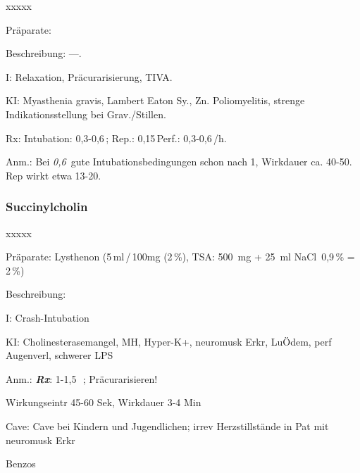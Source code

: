 \begin{labeling}[~]{xxxxx}
  \item[Präparate:] 
  \item[Beschreibung:] ---.
  \item[I:]Relaxation, Präcurarisierung, TIVA.
  \item[KI:]Myasthenia gravis, Lambert Eaton Sy., Zn.
  Poliomyelitis, strenge Indikationsstellung bei Grav./Stillen.
  \item[Rx:] Intubation: 0,3-0,6\,; Rep.:
  0,15\,\newline Perf.: 0,3-0,6\,/h.
  \item[Anm.:] Bei \textit{0,6\,} gute Intubationsbedingungen schon nach
  1{\textquotesingle}, Wirkdauer ca. 40-50{\textquotesingle}. Rep wirkt
  etwa 13-20{\textquotesingle}.
\end{labeling}



\subsubsection{Succinylcholin}
\begin{labeling}[~]{xxxxx}
  \item[Präparate:] Lysthenon (5\,ml\,/\,100mg (2\,\%), TSA: 500~mg + 25~ml NaCl~0,9\,\% = 2\,\%)
  \item[Beschreibung:] 
  \item[I:] Crash-Intubation
  \item[KI:] Cholinesterasemangel, MH, Hyper-K+, neuromusk
Erkr, LuÖdem, perf Augenverl, schwerer LPS
\item[Anm.:] \textbf{\textit{Rx}}: 1-1,5~\,; Präcurarisieren!


Wirkungseintr 45-60 Sek, Wirkdauer 3-4 Min
\item[Cave:] Cave bei Kindern und Jugendlichen; irrev Herzstillstände in Pat mit
neuromusk Erkr
\end{labeling}






Benzo{\textquotesingle}s


